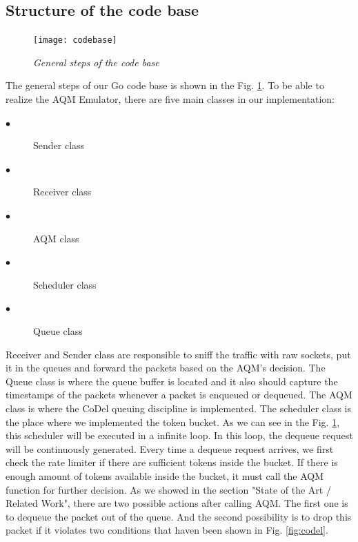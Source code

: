 \subsection{Structure of the code base}
\begin{figure}[htbp]
\centering
\texttt{[image: codebase]}
\caption{\em General steps of the code base}
\label{fig:codebase}
\end{figure}
The general steps of our Go code base is shown in the Fig. \ref{fig:codebase}. To be able to realize the AQM Emulator, there are five main classes in our implementation:
\begin{description}
  \item[$\bullet$] Sender class
  \item[$\bullet$] Receiver class
   \item[$\bullet$] AQM class
   \item[$\bullet$] Scheduler class
   \item[$\bullet$] Queue class	
   
\end{description}
Receiver and Sender class are responsible to sniff the traffic with raw sockets, put it in the queues and forward the packets based on the AQM's decision. The Queue class is where the queue buffer is located and it also should capture the timestamps of the packets whenever a packet is enqueued or dequeued. The AQM class is where the CoDel queuing discipline is implemented. The scheduler class is the place where we implemented the token bucket. As we can see in the Fig. \ref{fig:codebase}, this scheduler will be executed in a infinite loop. In this loop, the dequeue request will be continuously generated. Every time a dequeue request arrives, we first check the rate limiter if there are sufficient tokens inside the bucket. If there is enough amount of tokens available inside the bucket, it must call the AQM function for further decision. As we showed in the section "State of the Art / Related Work", there are two possible actions after calling AQM. The first one is to dequeue the packet out of the queue. And the second possibility is to drop this packet if it violates two conditions that haven been shown in Fig. \ref{fig:codel}. 

